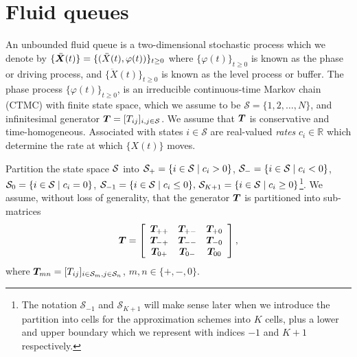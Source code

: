 \section{Fluid queues}\label{sec: fqs}
An unbounded fluid queue is a two-dimensional stochastic process which we denote by \(\{\ddot{\boldsymbol X}(t)\} = \{(\ddot X(t),\varphi(t))\}_{t\geq0}\) where \(\{\varphi(t)\}_{t\geq0}\) is known as the phase or driving process, and \(\{\ddot X(t)\}_{t\geq0}\) is known as the level process or buffer. The phase process \(\{\varphi(t)\}_{t\geq0}\), is an irreducible continuous-time Markov chain (CTMC) with finite state space, which we assume to be \(\mathcal S=\{1,2,\dots,N\}\), and infinitesimal generator \(\boldsymbol T= [T_{ij}]_{i,j\in\mathcal S}\). We assume that \(\boldsymbol T\) is {conservative} and time-homogeneous. Associated with states \(i\in\mathcal S\) are real-valued \emph{rates} \(c_i\in\mathbb R\) which determine the rate at which \(\{X(t)\}\) moves. 

Partition the state space \(\mathcal{S}\) into \(\mathcal{S}_+ = \{i\in\mathcal{S}\mid c_i>0\}\), \(\mathcal{S}_- = \{i\in\mathcal{S}\mid c_i<0\}\), \(\mathcal{S}_0 = \{i\in\mathcal{S}\mid c_i=0\}\), \(\mathcal S_{-1}=\{i\in\mathcal{S}\mid c_i\leq0\},\, \mathcal S_{K+1}=\{i\in\mathcal{S}\mid c_i\geq0\}\)\footnote{The notation \(\mathcal S_{-1}\) and \(\mathcal S_{K+1}\) will make sense later when we introduce the partition into cells for the approximation schemes into \(K\) cells, plus a lower and upper boundary which we represent with indices \(-1\) and \(K+1\) respectively.}. We assume, without loss of generality, that the generator \(\boldsymbol T\) is partitioned into sub-matrices
\[\boldsymbol T = \left[\begin{array}{ccc}\boldsymbol T_{++} & \boldsymbol T_{+-} & \boldsymbol T_{+0} \\ \boldsymbol T_{-+} & \boldsymbol T_{--} & \boldsymbol T_{-0} \\ \boldsymbol T_{0+} & \boldsymbol T_{0-} & \boldsymbol T_{00}  \end{array}\right],\]
where \(\boldsymbol T_{mn} = [T_{ij}]_{i\in\mathcal S_m, j\in\mathcal S_n}\), \(m,n\in\{+,-,0\}\).


